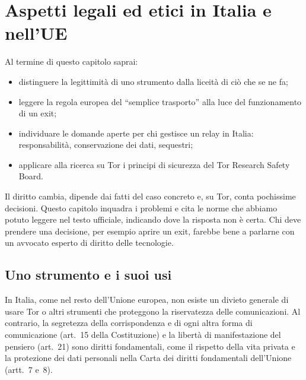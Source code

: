 \chapter{Aspetti legali ed etici in Italia e nell'UE}\label{cap:25-legale}

\begin{obiettivi}
Al termine di questo capitolo saprai:
\begin{itemize}[nosep]
  \item distinguere la legittimità di uno strumento dalla liceità di ciò che se ne fa;
  \item leggere la regola europea del \enquote{semplice trasporto} alla luce del funzionamento di un exit;
  \item individuare le domande aperte per chi gestisce un relay in Italia: responsabilità, conservazione dei dati, sequestri;
  \item applicare alla ricerca su Tor i principi di sicurezza del Tor Research Safety Board.
\end{itemize}
\end{obiettivi}

\begin{attenzione}
Il diritto cambia, dipende dai fatti del caso concreto e, su Tor, conta pochissime decisioni. Questo capitolo inquadra i problemi e cita le norme che abbiamo potuto leggere nel testo ufficiale, indicando dove la risposta non è certa. Chi deve prendere una decisione, per esempio aprire un exit, farebbe bene a parlarne con un avvocato esperto di diritto delle tecnologie.
\end{attenzione}

\section{Uno strumento e i suoi usi}\label{sec:legale-strumento}

In Italia, come nel resto dell'Unione europea, non esiste un divieto generale di usare Tor o altri strumenti che proteggono la riservatezza delle comunicazioni. Al contrario, la segretezza della corrispondenza e di ogni altra forma di comunicazione (art.~15 della Costituzione) e la libertà di manifestazione del pensiero (art.~21) sono diritti fondamentali, come il rispetto della vita privata e la protezione dei dati personali nella Carta dei diritti fondamentali dell'Unione (artt.~7 e~8).

